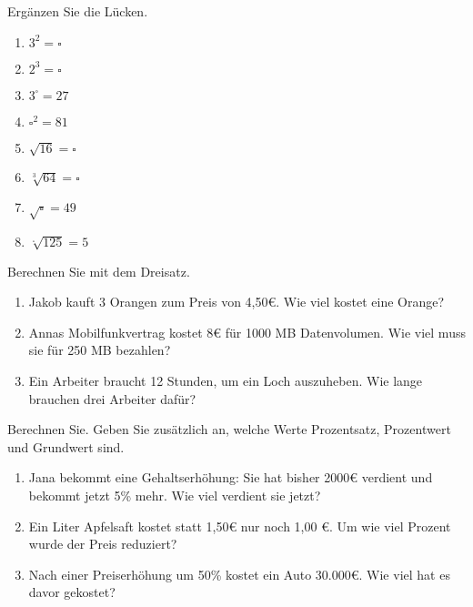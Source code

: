 \documentclass[11pt, a4paper, oneside]{article}
\begin{document}
	Ergänzen Sie die Lücken.
	
	\begin{multicols}{4}
		\begin{enumerate}[label=\alph*)]
			\item $3^2 = \square$
			\item $2^3 = \square$
			\item $3^\square = 27$
			\item $\square^2 = 81$
			\item $\sqrt{16} = \square$
			\item $\sqrt[3]{64} = \square$
			\item $\sqrt{\square} = 49$
			\item $\sqrt[\square]{125} = 5$
		\end{enumerate}
	\end{multicols}
	
	\checkered[6cm]
	
	
	Berechnen Sie mit dem Dreisatz.
	
	\begin{enumerate}[label=\alph*)]
		\item Jakob kauft 3 Orangen zum Preis von 4,50€. Wie viel kostet eine Orange?
		\item Annas Mobilfunkvertrag kostet 8€ für 1000 MB Datenvolumen. Wie viel muss sie für 250 MB bezahlen?
		\item Ein Arbeiter braucht 12 Stunden, um ein Loch auszuheben. Wie lange brauchen drei Arbeiter dafür?
	\end{enumerate}
	
	\checkered[7cm]
	
	
	Berechnen Sie. Geben Sie zusätzlich an, welche Werte Prozentsatz, Prozentwert und Grundwert sind.
	
	\begin{enumerate}[label=\alph*)]
		\item Jana bekommt eine Gehaltserhöhung: Sie hat bisher 2000€ verdient und bekommt jetzt 5\% mehr. Wie viel verdient sie jetzt?
		\item Ein Liter Apfelsaft kostet statt 1,50€ nur noch 1,00 €. Um wie viel Prozent wurde der Preis reduziert?
		\item Nach einer Preiserhöhung um 50\% kostet ein Auto 30.000€. Wie viel hat es davor gekostet?
	\end{enumerate}
	
\end{document}

